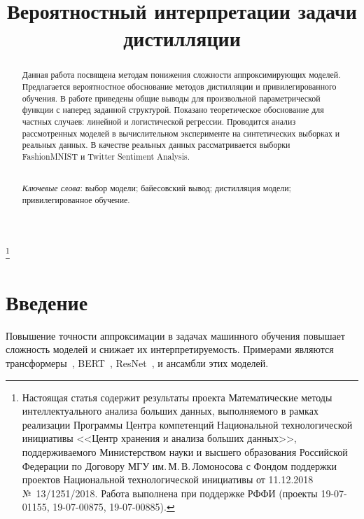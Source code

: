 \documentclass[12pt]{a&t}
\begin{document}

\title{Вероятностный интерпретации задачи дистилляции}%
\thanks{Настоящая статья содержит результаты проекта Математические методы интеллектуального анализа больших данных, выполняемого в рамках реализации Программы Центра компетенций Национальной технологической инициативы <<Центр хранения и анализа больших данных>>, поддерживаемого Министерством науки и высшего образования Российской Федерации по Договору МГУ им.\,М.\,В.\,Ломоносова с Фондом поддержки проектов Национальной технологической инициативы от 11.12.2018 №~13/1251/2018. Работа выполнена при поддержке РФФИ (проекты 19-07-01155, 19-07-00875, 19-07-00885).}


\maketitle

\begin{abstract}
Данная работа посвящена методам понижения сложности аппроксимирующих моделей. Предлагается вероятностное обоснование методов дистилляции и привилегированного обучения. В работе приведены общие выводы для произвольной параметрической функции с наперед заданной структурой. Показано теоретическое обоснование для частных случаев: линейной и логистической регрессии. Проводится анализ рассмотренных моделей в вычислительном эксперименте на синтетических выборках и реальных данных. В качестве реальных данных рассматривается выборки FashionMNIST и Twitter Sentiment Analysis.

\smallskip\\
\textit{Ключевые слова}: выбор модели; байесовский вывод; дистилляция модели; привилегированное обучение.
\end{abstract}


\section{Введение}
Повышение точности аппроксимации в задачах машинного обучения повышает  сложность моделей и снижает их интерпретируемость. Примерами являются  трансформеры~\cite{Vaswani2017}, BERT~\cite{Devlin2018}, ResNet~\cite{Kaiming2015}, и ансамбли этих моделей. 
\end{document}
